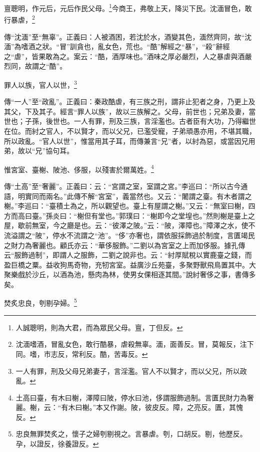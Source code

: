亶聰明，作元后，元后作民父母。\footnote{人誠聰明，則為大君，而為眾民父母。亶，丁但反。}今商王，弗敬上天，降災下民。沈湎冒色，敢行暴虐，\footnote{沈湎嗜酒，冒亂女色，敢行酷暴，虐殺無辜。湎，面善反。冒，莫報反，注下同。嗜，市志反，常利反。酷，苦毒反。}

{\noindent\shu{}\fzkt 傳“沈湎”至“無辜”。正義曰：人被酒困，若沈於水，酒變其色，湎然齊同，故“沈湎”為嗜酒之狀。“冒”訓貪也，亂女色，荒也。“酷”解經之“暴”，“殺”辭經之“虐”，皆果敢為之。案云：“酷，酒厚味也。”酒味之厚必嚴烈，人之暴虐與酒嚴烈同，故謂之“酷”。 \par}

罪人以族，官人以世，\footnote{一人有罪，刑及父母兄弟妻子，言淫濫。官人不以賢才，而以父兄，所以政亂。}

{\noindent\zhuan{}\fzbyks 傳“一人”至“政亂”。正義曰：秦政酷虐，有三族之刑，謂非止犯者之身，乃更上及其父，下及其子。經言“罪人以族”，故以三族解之。父母，前世也；兄弟及妻，當世也；子孫，後世也。一人有罪，刑及三族，言淫濫也。古者臣有大功，乃得繼世在位。而紂之官人，不以賢才，而以父兄，已濫受寵，子弟頑愚亦用，不堪其職，所以政亂。“官人以世”，惟當用其子耳，而傳兼言“兄”者，以紂為惡，或當因兄用弟，故以“兄”協句耳。 \par}

惟宮室、臺榭、陂池、侈服，以殘害於爾萬姓。\footnote{土高曰臺，有木曰榭，澤障曰陂，停水曰池，侈謂服飾過制。言匱民財力為奢麗。榭，云：“有木曰榭。”本又作謝。陂，彼皮反。障，之亮反。匱，其愧反。}

{\noindent\zhuan{}\fzbyks 傳“土高”至“奢麗”。正義曰：云：“宮謂之室，室謂之宮。”李巡曰：“所以古今通語，明實同而兩名。”此傳不解“宮室”，義當然也。又云：“闍謂之臺。有木者謂之榭。”李巡曰：“臺積土為之，所以觀望也。臺上有屋謂之榭。”又云：“無室曰榭，四方而高曰臺。”孫炎曰：“榭但有堂也。”郭璞曰：“榭即今之堂堭也。”然則榭是臺上之屋，歇前無室，今之廳是也。云：“彼澤之陂。”云：“陂，澤障也。”障澤之水，使不流溢謂之“陂”，停水不流謂之“池”。“侈”亦奢也，謂依服採飾過於制度，言匱竭民之財力為奢麗也。顧氏亦云：“華侈服飾。”二劉以為宮室之上而加侈服。據孔傳云“服飾過制”，即謂人之服飾，二劉之說非也。云：“紂厚賦稅以實鹿臺之錢，而盈巨橋之粟。益收狗馬奇物，充牣宮室。益廣沙丘苑臺，多聚野獸飛鳥置其中。大聚樂戲於沙丘，以酒為池，懸肉為林，使男女倮相逐其間。”說紂奢侈之事，書傳多矣。 \par}

焚炙忠良，刳剔孕婦。\footnote{忠良無罪焚炙之，懷子之婦刳剔視之。言暴虐。刳，口胡反。剔，他歷反。孕，以證反，徐養證反。}

